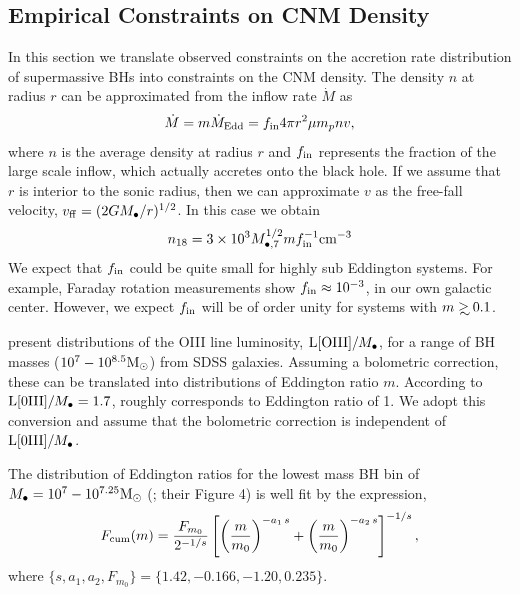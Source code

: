 \documentclass[usenatbib,fleqn]{mnras}
\newcommand\gsim{\mathrel{\rlap{\lower4pt\hbox{\hskip1pt$\sim$}}
    \raise1pt\hbox{$>$}}}
\newcommand{\Mbh}[1][]{M_{\bullet#1}}
\newcommand{\Msun}{{\rm M_\odot}}
\begin{document}
\subsection{Empirical Constraints on CNM Density}

In this section we translate observed constraints on the accretion
rate distribution of supermassive BHs into constraints on the CNM
density.  The density $n$ at radius $r$ can be approximated from the
inflow rate $\dot{M}$ as
\begin{equation}
\dot{M} = m \dot{M}_{\rm Edd}= f_{\rm in} 4 \pi r^2 \mu m_p n v,
\label{eq:mdot}
\end{equation}
where $n$ is the average density at radius $r$ and $f_{\rm in}$
represents the fraction of the large scale inflow, which actually
accretes onto the black hole.  If we assume that $r$ is interior to
the sonic radius, then we can approximate $v$ as the free-fall
velocity, $v_{\rm ff} = (2 G \Mbh/r)^{1/2}$.  In this case we
obtain
\begin{equation}
n_{18} = 3 \times 10^3 M_{\bullet,7}^{1/2} m f_{\rm in}^{-1} {\rm
  cm}^{-3}
\label{eq:n18Edd}
\end{equation}
We expect that $f_{\rm in}$ could be quite small for highly sub
Eddington systems. For example, Faraday rotation measurements
\citep{Quataert+2000} show $f_{\rm in}\approx 10^{-3}$, in our own
galactic center. However, we expect $f_{\rm in}$ will be of order
unity for systems with $m\gsim 0.1$.  

\citet{Kauffmann+2009} present distributions of the OIII line
luminosity, ${\rm L[OIII]}/\Mbh$, for a range of BH masses
($10^7-10^{8.5} \Msun$) from SDSS galaxies.  Assuming a bolometric
correction, these can be translated into distributions of Eddington
ratio $m$.  According to \citet{Kauffmann+2009} ${\rm
  L[0III]}/\Mbh=1.7$, roughly corresponds to Eddington ratio of 1. We
adopt this conversion and assume that the bolometric correction is
independent of ${\rm L[0III]}/\Mbh$. 

The distribution of Eddington ratios for the lowest mass BH bin of
$M_{\bullet} = 10^7 - 10^{7.25} \Msun$ (\citealt{Kauffmann+2009};
their Figure 4) is well fit by the expression,
\begin{align}
  F_{\rm cum}(m)=\frac{F_{m_0}}{2^{-1/s}}
  \left[\left(\frac{m}{m_0}\right)^{-a_1\,
      s}+\left(\frac{m}{m_0}\right)^{-a_2 \, s}\right]^{-1/s} \label{eq:khFit},
\end{align}
where $\{s, a_1, a_2, F_{m_0}\} =\{1.42, -0.166, -1.20, 0.235\}$.
\end{document}

